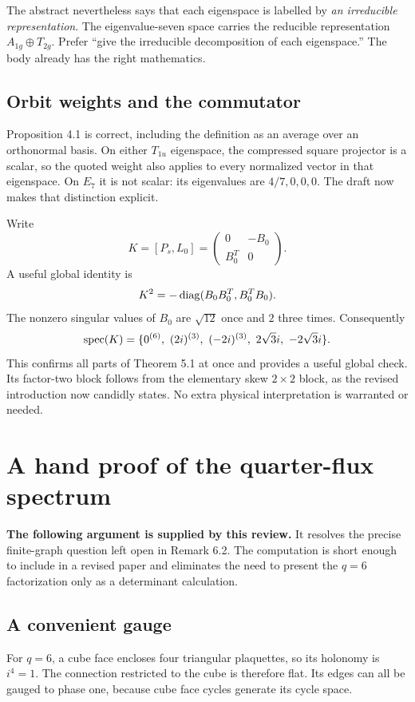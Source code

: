 \documentclass[11pt,a4paper]{article}
\begin{document}
The abstract nevertheless says that each eigenspace is labelled by \emph{an irreducible representation}. The eigenvalue-seven space carries the reducible representation $A_{1g}\oplus T_{2g}$. Prefer ``give the irreducible decomposition of each eigenspace.'' The body already has the right mathematics.

\subsection{Orbit weights and the commutator}
Proposition 4.1 is correct, including the definition as an average over an orthonormal basis. On either $T_{1u}$ eigenspace, the compressed square projector is a scalar, so the quoted weight also applies to every normalized vector in that eigenspace. On $E_7$ it is not scalar: its eigenvalues are $4/7,0,0,0$. The draft now makes that distinction explicit.

Write
\[
 K=[P_s,L_0]=\begin{pmatrix}0&-B_0\\B_0^T&0\end{pmatrix}.
\]
A useful global identity is
\[
 K^2=-\operatorname{diag}(B_0B_0^T,B_0^TB_0).
\]
The nonzero singular values of $B_0$ are $\sqrt{12}$ once and $2$ three times. Consequently
\[
 \spec(K)=\{0^{(6)},\ (2i)^{(3)},\ (-2i)^{(3)},\ 2\sqrt3 i,\ -2\sqrt3 i\}.
\]
This confirms all parts of Theorem 5.1 at once and provides a useful global check. Its factor-two block follows from the elementary skew $2\times2$ block, as the revised introduction now candidly states. No extra physical interpretation is warranted or needed.

\section{A hand proof of the quarter-flux spectrum}\label{sec:newproof}
\textbf{The following argument is supplied by this review.} It resolves the precise finite-graph question left open in Remark 6.2. The computation is short enough to include in a revised paper and eliminates the need to present the $q=6$ factorization only as a determinant calculation.

\subsection{A convenient gauge}
For $q=6$, a cube face encloses four triangular plaquettes, so its holonomy is $i^4=1$. The connection restricted to the cube is therefore flat. Its edges can all be gauged to phase one, because cube face cycles generate its cycle space.
\end{document}
